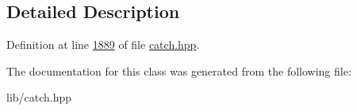 \subsection{Detailed Description}


Definition at line \mbox{\hyperlink{catch_8hpp_source_l01889}{1889}} of file \mbox{\hyperlink{catch_8hpp_source}{catch.\+hpp}}.



The documentation for this class was generated from the following file\+:\begin{DoxyCompactItemize}
\item 
lib/catch.\+hpp\end{DoxyCompactItemize}
